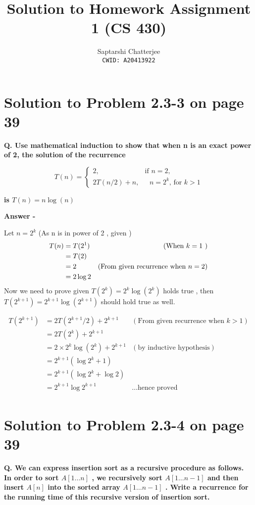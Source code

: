 \documentclass[5pt]{article}
\title{Solution to Homework Assignment 1 (CS 430)}
\author{Saptarshi Chatterjee \\
\texttt{CWID: A20413922}
}
\begin{document}
\maketitle

\section{Solution to Problem 2.3-3 on page 39}
\textbf{Q. Use mathematical induction to show that when n is an exact power of 2, the solution of the recurrence}

\begin{equation*}
  T(n) =\begin{cases}
    2, & \text{if $n = 2$},\\
    2T(n/2) + n, & \text{ $n = 2^k $, for $k > 1$}
  \end{cases}
\end{equation*}

\textbf{is $T(n) = n \log(n)$}

\setlength{\parskip}{1.2em}
\setlength{\parindent}{0em}

\textbf{Answer -}

Let $n = 2^k$  (As n is in power of 2 , given )
\begin{align*}
T(n) & = T(2^1)  & \text{(When $ k = 1 $ )}\\
& = T(2) \\
& = 2  & (\text{From given recurrence when $n = 2$})\\
& = 2 \log 2
\end{align*}
Now we need to prove given $T(2^k) = 2^k \log(2^k)$ holds true , then $T(2^{k+1}) = 2^{k+1} \log(2^{k+1})$ should hold true as well.

\begin{align*}
T(2^{k+1}) & = 2T(2^{k+1}/2) + 2^{k+1}  & (\text{From given recurrence when $k > 1$})\\
& = 2T(2^k) + 2^{k+1}\\
& = 2 \times 2^k \log(2^k) + 2^{k+1} & (\text{by inductive hypothesis})\\
& = 2^{k+1}( \log 2^k + 1 ) \\
& = 2^{k+1}( \log 2^k + \log 2) \\
& = 2^{k+1} \log 2^{k+1} & \text{\ldots hence proved}\\
\end{align*}

\section{Solution to Problem 2.3-4 on page 39}
\textbf{Q. We can express insertion sort as a recursive procedure as follows. In order to sort $A[1 \ldots n]$ , we recursively sort $A[1 \ldots n-1]$  and then insert $A[n]$  into the sorted array $A[1 \ldots n-1]$ . Write a recurrence for the running time of this recursive version of insertion sort.}
\end{document}
